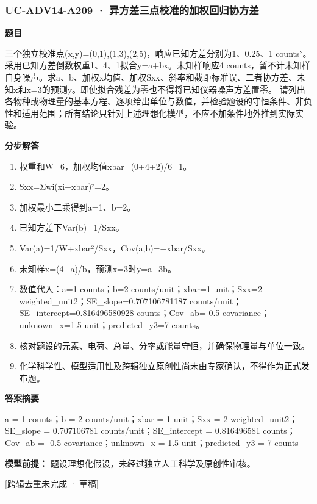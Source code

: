 \documentclass[UTF8,11pt,a4paper]{ctexart}
\begin{document}
\subsubsection*{UC-ADV14-A209 · 异方差三点校准的加权回归协方差}
\noindent\textbf{题目}\par
三个独立校准点(x,y)=(0,1),(1,3),(2,5)，响应已知方差分别为1、0.25、1 counts²。采用已知方差倒数权重1、4、1拟合y=a+bx。未知样响应4 counts，暂不计未知样自身噪声。求a、b、加权x均值、加权Sxx、斜率和截距标准误、二者协方差、未知x和x=3的预测y。即使拟合残差为零也不得将已知仪器噪声方差置零。 请列出各物种或物理量的基本方程、逐项给出单位与数值，并检验题设的守恒条件、非负性和适用范围；所有结论只针对上述理想化模型，不应不加条件地外推到实际实验。\par
\medskip\noindent\textbf{分步解答}
\begin{enumerate}
\item 权重和W=6，加权均值xbar=(0+4+2)/6=1。
\item Sxx=Σwi(xi−xbar)²=2。
\item 加权最小二乘得到a=1、b=2。
\item 已知方差下Var(b)=1/Sxx。
\item Var(a)=1/W+xbar²/Sxx，Cov(a,b)=−xbar/Sxx。
\item 未知样x=(4−a)/b，预测x=3时y=a+3b。
\item 数值代入：a=1 counts；b=2 counts/unit；xbar=1 unit；Sxx=2 weighted\_unit2；SE\_slope=0.707106781187 counts/unit；SE\_intercept=0.816496580928 counts；Cov\_ab=-0.5 covariance；unknown\_x=1.5 unit；predicted\_y3=7 counts。
\item 核对题设的元素、电荷、总量、分率或能量守恒，并确保物理量与单位一致。
\item 化学科学性、模型适用性及跨辑独立原创性尚未由专家确认，不得作为正式发布题。
\end{enumerate}
\noindent\textbf{答案摘要}\par
a = 1 counts；b = 2 counts/unit；xbar = 1 unit；Sxx = 2 weighted\_unit2；SE\_slope = 0.707106781 counts/unit；SE\_intercept = 0.816496581 counts；Cov\_ab = -0.5 covariance；unknown\_x = 1.5 unit；predicted\_y3 = 7 counts\par
\noindent\textbf{模型前提：}
题设理想化假设，未经过独立人工科学及原创性审核。\par
\noindent\textcolor{red!65!black}{[跨辑去重未完成 · 草稿]} \par
\medskip\hrule\medskip
{}
\end{document}
